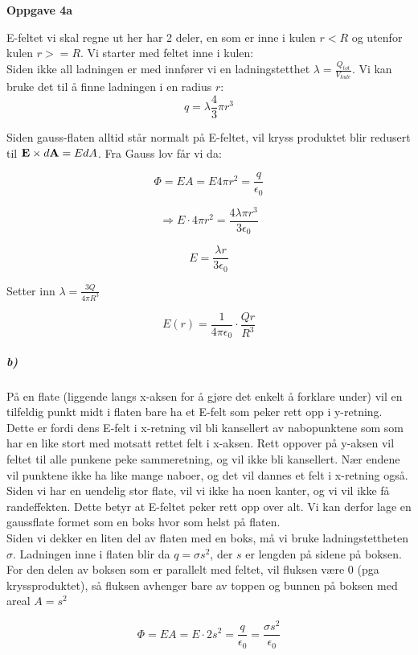 \documentclass[a4paper,norsk, 10pt]{article}
\begin{document}
\textbf{Oppgave 4a}


E-feltet vi skal regne ut her har 2 deler, en som er inne i kulen $r < R$ og utenfor kulen $r >= R$. Vi starter med feltet inne i kulen:\\

 
Siden ikke all ladningen er med innfører vi en ladningstetthet $\lambda = \frac{Q_{tot}}{V_{kule}}$. Vi kan bruke det til å finne ladningen i en radius $r$: 
$$ q = \lambda \dfrac{4}{3} \pi r^{3} $$

Siden gauss-flaten alltid står normalt på E-feltet, vil kryss produktet blir redusert til $\bold{E} \times d\bold{A} = EdA$. Fra Gauss lov får vi da:

$$ \Phi = EA = E 4 \pi r^2 = \dfrac{q}{\epsilon_0} $$

$$ \Rightarrow E\cdot 4 \pi r^2 =  \dfrac{4\lambda  \pi r^3}{3\epsilon_0} $$

$$ E = \frac{\lambda r}{3\epsilon_0} $$

Setter inn $\lambda = \frac{3Q}{4\pi R^3}$

\begin{equation}
E(r) = \dfrac{1}{4 \pi \epsilon_0} \cdot \dfrac{Qr}{R^3}
\end{equation}



\subparagraph*{b)}

På en flate (liggende langs x-aksen for å gjøre det enkelt å forklare under) vil en tilfeldig punkt midt i flaten bare ha et E-felt som peker rett opp i y-retning. Dette er fordi dens E-felt i x-retning vil bli kansellert av nabopunktene som som har en like stort med motsatt rettet felt i x-aksen. Rett oppover på y-aksen vil feltet til alle punkene peke sammeretning, og vil ikke bli kansellert. Nær endene vil punktene ikke ha like mange naboer, og det vil dannes et felt i x-retning også. Siden vi har en uendelig stor flate, vil vi ikke ha noen kanter, og vi vil ikke få randeffekten. Dette betyr at E-feltet peker rett opp over alt. Vi kan derfor lage en gaussflate formet som en boks hvor som helst på flaten. \\ 

Siden vi dekker en liten del av flaten med en boks, må vi bruke ladningstettheten $\sigma$. Ladningen inne i flaten blir da $q = \sigma s^2$, der $s$ er lengden på sidene på boksen. For den delen av boksen som er parallelt med feltet, vil fluksen være 0 (pga kryssproduktet), så fluksen avhenger bare av toppen og bunnen på boksen med areal $A=s^2$

$$
\Phi = EA = E \cdot 2s^2  = \dfrac{q}{\epsilon_0} = \dfrac{\sigma s^2}{\epsilon_0}
$$
\end{document}
